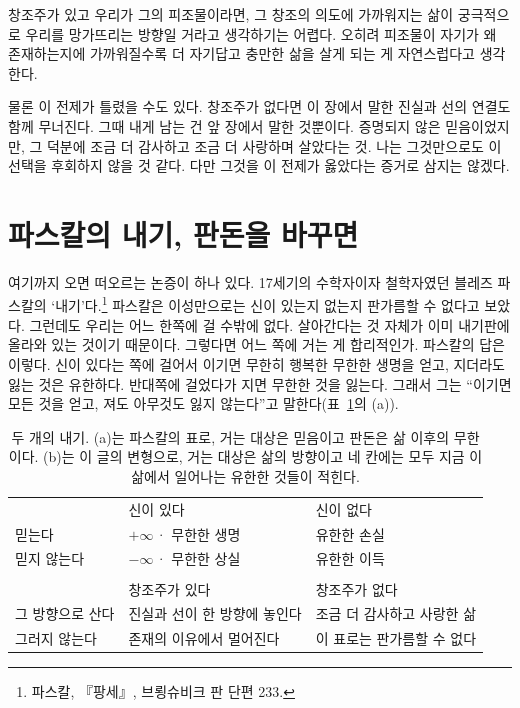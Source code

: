 \documentclass[11pt]{article}
\begin{document}
창조주가 있고 우리가 그의 피조물이라면, 그 창조의 의도에 가까워지는 삶이
궁극적으로 우리를 망가뜨리는 방향일 거라고 생각하기는 어렵다. 오히려 피조물이
자기가 왜 존재하는지에 가까워질수록 더 자기답고 충만한 삶을 살게 되는 게
자연스럽다고 생각한다.

물론 이 전제가 틀렸을 수도 있다. 창조주가 없다면 이 장에서 말한 진실과 선의 연결도
함께 무너진다. 그때 내게 남는 건 앞 장에서 말한 것뿐이다. 증명되지 않은
믿음이었지만, 그 덕분에 조금 더 감사하고 조금 더 사랑하며 살았다는 것. 나는
그것만으로도 이 선택을 후회하지 않을 것 같다. 다만 그것을 이 전제가 옳았다는
증거로 삼지는 않겠다.

\section{파스칼의 내기, 판돈을 바꾸면}

여기까지 오면 떠오르는 논증이 하나 있다. 17세기의 수학자이자 철학자였던 블레즈
파스칼의 ‘내기’다.\footnote{파스칼, 『팡세』, 브룅슈비크 판 단편 233.} 파스칼은
이성만으로는 신이 있는지 없는지 판가름할 수 없다고 보았다. 그런데도 우리는 어느
한쪽에 걸 수밖에 없다. 살아간다는 것 자체가 이미 내기판에 올라와 있는 것이기
때문이다. 그렇다면 어느 쪽에 거는 게 합리적인가. 파스칼의 답은 이렇다. 신이
있다는 쪽에 걸어서 이기면 무한히 행복한 무한한 생명을 얻고, 지더라도 잃는 것은
유한하다. 반대쪽에 걸었다가 지면 무한한 것을 잃는다. 그래서 그는 “이기면 모든
것을 얻고, 져도 아무것도 잃지 않는다”고 말한다(표~\ref{tab:wager}의 (a)).

\begin{table}[htb]
\centering\footnotesize
\caption{두 개의 내기. (a)는 파스칼의 표로, 거는 대상은 믿음이고 판돈은 삶 이후의
무한이다. (b)는 이 글의 변형으로, 거는 대상은 삶의 방향이고 네 칸에는 모두 지금
이 삶에서 일어나는 유한한 것들이 적힌다.}
\label{tab:wager}
\renewcommand{\arraystretch}{1.45}
\begin{tabular}{@{}>{\raggedright\arraybackslash}p{2.8cm}
                >{\centering\arraybackslash}p{4.6cm}
                >{\centering\arraybackslash}p{4.6cm}@{}}
  \multicolumn{3}{@{}l@{}}{\small (a) 파스칼의 내기} \\[0.2em]
  \toprule
  & 신이 있다 & 신이 없다 \\
  \midrule
  믿는다      & $+\infty$\,· 무한한 생명 & 유한한 손실 \\
  믿지 않는다 & $-\infty$\,· 무한한 상실 & 유한한 이득 \\
  \bottomrule
  \addlinespace[1.4em]
  \multicolumn{3}{@{}l@{}}{\small (b) 이 글의 변형} \\[0.2em]
  \toprule
  & 창조주가 있다 & 창조주가 없다 \\
  \midrule
  그 방향으로 산다 & 진실과 선이 한 방향에 놓인다 & 조금 더 감사하고 사랑한 삶 \\
  그러지 않는다   & 존재의 이유에서 멀어진다     & 이 표로는 판가름할 수 없다 \\
  \bottomrule
\end{tabular}
\end{table}
\end{document}
